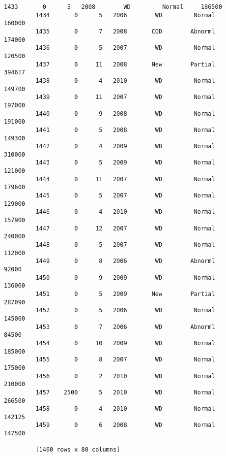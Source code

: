 \documentclass[11pt]{article}
\begin{document}
\begin{Verbatim}[commandchars=\\\{\}]
         1433       0      5   2008        WD         Normal     186500  
         1434       0      5   2006        WD         Normal     160000  
         1435       0      7   2008       COD        Abnorml     174000  
         1436       0      5   2007        WD         Normal     120500  
         1437       0     11   2008       New        Partial     394617  
         1438       0      4   2010        WD         Normal     149700  
         1439       0     11   2007        WD         Normal     197000  
         1440       0      9   2008        WD         Normal     191000  
         1441       0      5   2008        WD         Normal     149300  
         1442       0      4   2009        WD         Normal     310000  
         1443       0      5   2009        WD         Normal     121000  
         1444       0     11   2007        WD         Normal     179600  
         1445       0      5   2007        WD         Normal     129000  
         1446       0      4   2010        WD         Normal     157900  
         1447       0     12   2007        WD         Normal     240000  
         1448       0      5   2007        WD         Normal     112000  
         1449       0      8   2006        WD        Abnorml      92000  
         1450       0      9   2009        WD         Normal     136000  
         1451       0      5   2009       New        Partial     287090  
         1452       0      5   2006        WD         Normal     145000  
         1453       0      7   2006        WD        Abnorml      84500  
         1454       0     10   2009        WD         Normal     185000  
         1455       0      8   2007        WD         Normal     175000  
         1456       0      2   2010        WD         Normal     210000  
         1457    2500      5   2010        WD         Normal     266500  
         1458       0      4   2010        WD         Normal     142125  
         1459       0      6   2008        WD         Normal     147500  
         
         [1460 rows x 80 columns]
\end{Verbatim}
            
\end{document}
